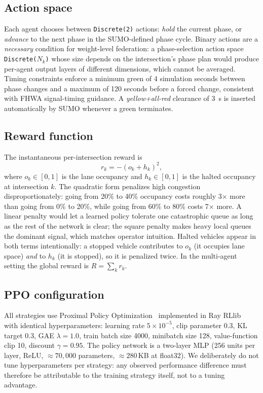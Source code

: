 \documentclass[conference]{IEEEtran}
\begin{document}
\subsection{Action space}\label{sec:framework-action}
Each agent chooses between \texttt{Discrete(2)} actions: \emph{hold} the current phase, or \emph{advance} to the next phase in the SUMO-defined phase cycle. Binary actions are a \emph{necessary} condition for weight-level federation: a phase-selection action space \texttt{Discrete($N_k$)} whose size depends on the intersection's phase plan would produce per-agent output layers of different dimensions, which cannot be averaged. Timing constraints enforce a minimum green of 4 simulation seconds between phase changes and a maximum of 120 seconds before a forced change, consistent with FHWA signal-timing guidance. A \emph{yellow+all-red} clearance of 3~s is inserted automatically by SUMO whenever a green terminates.

\subsection{Reward function}\label{sec:framework-reward}
The instantaneous per-intersection reward is
\begin{equation}
r_k = -(o_k + h_k)^2, \label{eq:reward}
\end{equation}
where $o_k\in[0,1]$ is the lane occupancy and $h_k\in[0,1]$ is the halted occupancy at intersection $k$. The quadratic form penalizes high congestion disproportionately: going from 20\% to 40\% occupancy costs roughly 3$\times$ more than going from 0\% to 20\%, while going from 60\% to 80\% costs 7$\times$ more. A linear penalty would let a learned policy tolerate one catastrophic queue as long as the rest of the network is clear; the square penalty makes heavy local queues the dominant signal, which matches operator intuition. Halted vehicles appear in both terms intentionally: a stopped vehicle contributes to $o_k$ (it occupies lane space) \emph{and} to $h_k$ (it is stopped), so it is penalized twice. In the multi-agent setting the global reward is $R = \sum_k r_k$.

\subsection{PPO configuration}\label{sec:framework-ppo}
All strategies use Proximal Policy Optimization~\cite{schulman2017ppo} implemented in Ray RLlib~\cite{liang2018rllib} with identical hyperparameters: learning rate $5\times 10^{-5}$, clip parameter 0.3, KL target 0.3, GAE $\lambda=1.0$, train batch size 4000, minibatch size 128, value-function clip 10, discount $\gamma=0.95$. The policy network is a two-layer MLP (256 units per layer, ReLU, $\approx\!70{,}000$ parameters, $\approx\!280$\,KB at float32). We deliberately do not tune hyperparameters per strategy: any observed performance difference must therefore be attributable to the training strategy itself, not to a tuning advantage.
\end{document}
